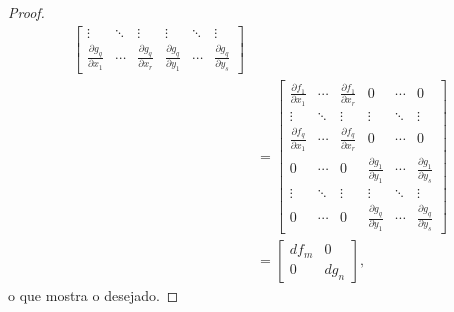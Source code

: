 \begin{lemma}
\begin{proof}
\begin{align*}
\begin{bmatrix}
					               \vdots                            & \ddots & \vdots                            & \vdots                            & \ddots & \vdots                            \\
					               \frac{\partial g_q}{\partial x_1} & \cdots & \frac{\partial g_q}{\partial x_r} & \frac{\partial g_q}{\partial y_1} & \cdots & \frac{\partial g_q}{\partial y_s}
				               \end{bmatrix}                                                                                                                     \\
				           & = \begin{bmatrix}
					               \frac{\partial f_1}{\partial x_1} & \cdots & \frac{\partial f_1}{\partial x_r} & 0                                 & \cdots & 0                                 \\
					               \vdots                            & \ddots & \vdots                            & \vdots                            & \ddots & \vdots                            \\
					               \frac{\partial f_q}{\partial x_1} & \cdots & \frac{\partial f_q}{\partial x_r} & 0                                 & \cdots & 0                                 \\
					               0                                 & \cdots & 0                                 & \frac{\partial g_1}{\partial y_1} & \cdots & \frac{\partial g_1}{\partial y_s} \\
					               \vdots                            & \ddots & \vdots                            & \vdots                            & \ddots & \vdots                            \\
					               0                                 & \cdots & 0                                 & \frac{\partial g_q}{\partial y_1} & \cdots & \frac{\partial g_q}{\partial y_s}
				               \end{bmatrix}                                                                                                                     \\
				           & = \begin{bmatrix} df_m & 0 \\ 0 & dg_n \end{bmatrix},
			\end{align*}
			o que mostra o desejado.
		\end{proof}
	\end{lemma}
